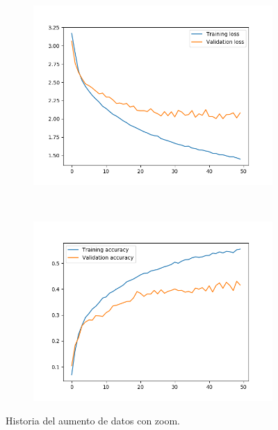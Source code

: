 \documentclass[11pt,a4paper]{article}
\begin{document}
\begin{figure}[H]
  \begin{subfigure}{.5\textwidth}
    \centering
    \includegraphics[scale=0.4]{img/aug-zoom-loss.png}
    \label{fig:aug-zoom-loss}
  \end{subfigure}%
  ~ \quad
  \begin{subfigure}{.5\textwidth}
    \centering
    \includegraphics[scale=0.4]{img/aug-zoom-acc.png}
    \label{fig:aug-zoom-acc}
  \end{subfigure}
  \caption{Historia del aumento de datos con zoom.}
  \label{fig:history-aug-zoom}
\end{figure}
\end{document}
